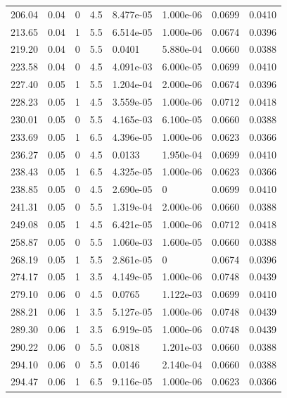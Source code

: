 \documentclass[preview]{standalone}
\begin{document}
{{{\begin{tabular}{L{1.2cm}C{1.2cm} C{0.3cm}C{0.5cm} C{1.4cm}C{1.4cm} C{1.4cm}C{1.4cm}}
  206.04  &  0.04  & 0     & 4.5 &  8.477e-05  & 1.000e-06  & 0.0699 &  0.0410   \\ 
  213.65  &  0.04  & 1     & 5.5 &  6.514e-05  & 1.000e-06  & 0.0674 &  0.0396   \\ 
  219.20  &  0.04  & 0     & 5.5 &  0.0401  & 5.880e-04  & 0.0660 &  0.0388   \\ 
  223.58  &  0.04  & 0     & 4.5 &  4.091e-03  & 6.000e-05  & 0.0699 &  0.0410   \\ 
  227.40  &  0.05  & 1     & 5.5 &  1.204e-04  & 2.000e-06  & 0.0674 &  0.0396   \\ 
  228.23  &  0.05  & 1     & 4.5 &  3.559e-05  & 1.000e-06  & 0.0712 &  0.0418   \\ 
  230.01  &  0.05  & 0     & 5.5 &  4.165e-03  & 6.100e-05  & 0.0660 &  0.0388   \\ 
  233.69  &  0.05  & 1     & 6.5 &  4.396e-05  & 1.000e-06  & 0.0623 &  0.0366   \\ 
  236.27  &  0.05  & 0     & 4.5 &  0.0133  & 1.950e-04  & 0.0699 &  0.0410   \\ 
  238.43  &  0.05  & 1     & 6.5 &  4.325e-05  & 1.000e-06  & 0.0623 &  0.0366   \\ 
  238.85  &  0.05  & 0     & 4.5 &  2.690e-05  & 0  & 0.0699 &  0.0410   \\ 
  241.31  &  0.05  & 0     & 5.5 &  1.319e-04  & 2.000e-06  & 0.0660 &  0.0388   \\ 
  249.08  &  0.05  & 1     & 4.5 &  6.421e-05  & 1.000e-06  & 0.0712 &  0.0418   \\ 
  258.87  &  0.05  & 0     & 5.5 &  1.060e-03  & 1.600e-05  & 0.0660 &  0.0388   \\ 
  268.19  &  0.05  & 1     & 5.5 &  2.861e-05  & 0  & 0.0674 &  0.0396   \\ 
  274.17  &  0.05  & 1     & 3.5 &  4.149e-05  & 1.000e-06  & 0.0748 &  0.0439   \\ 
  279.10  &  0.06  & 0     & 4.5 &  0.0765  & 1.122e-03  & 0.0699 &  0.0410   \\ 
  288.21  &  0.06  & 1     & 3.5 &  5.127e-05  & 1.000e-06  & 0.0748 &  0.0439   \\ 
  289.30  &  0.06  & 1     & 3.5 &  6.919e-05  & 1.000e-06  & 0.0748 &  0.0439   \\ 
  290.22  &  0.06  & 0     & 5.5 &  0.0818  & 1.201e-03  & 0.0660 &  0.0388   \\ 
  294.10  &  0.06  & 0     & 5.5 &  0.0146  & 2.140e-04  & 0.0660 &  0.0388   \\ 
  294.47  &  0.06  & 1     & 6.5 &  9.116e-05  & 1.000e-06  & 0.0623 &  0.0366   \\ 

\end{tabular}}}}
\end{document}
